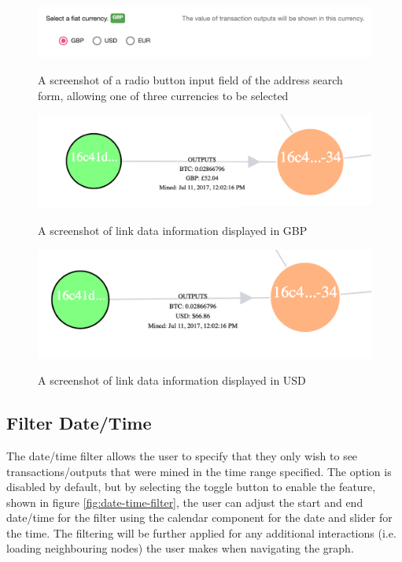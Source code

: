 \begin{figure}[h!]
  \centering
  \includegraphics[width = 15cm]{./figures/ui-screenshots/fiat-currency-selection}\\[0.5cm] 
  \caption{A screenshot of a radio button input field of the address search form, allowing one of three currencies to be selected}
  \label{fig:select-fiat-currencies}
\end{figure}
\begin{figure}[h!]
  \centering
  \includegraphics[width = 15cm]{./figures/ui-screenshots/fiat-currency-link-gbp}\\[0.5cm] 
  \caption{A screenshot of link data information displayed in GBP}
  \label{fig:select-fiat-currencies-gbp}
\end{figure}
\begin{figure}[h!]
  \centering
  \includegraphics[width = 15cm]{./figures/ui-screenshots/fiat-currency-link-usd}\\[0.5cm] 
  \caption{A screenshot of link data information displayed in USD}
  \label{fig:select-fiat-currencies-usd}
\end{figure}

\subsection{Filter Date/Time}
The date/time filter allows the user to specify that they only wish to see transactions/outputs that were mined in the time range specified. The option is disabled by default, but by selecting the toggle button to enable the feature, shown in figure \ref{fig:date-time-filter}, the user can adjust the start and end date/time for the filter using the calendar component for the date and slider for the time. The filtering will be further applied for any additional interactions (i.e. loading neighbouring nodes) the user makes when navigating the graph. 

